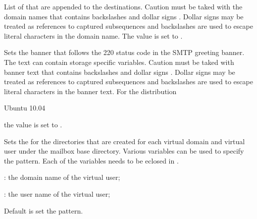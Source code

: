
List of  that are appended to the destinations.
Caution must be taked with the domain names that contains backslashes \qcode{\textbackslash} and 
dollar signs \qcode{\$}. Dollar signs may be treated as references to 
captured subsequences and backslashes are used to escape literal characters  in the domain name.
The value is set to .


Sets the banner  that follows the 220 status code in the SMTP 
greeting banner. The text can contain storage specific variables. Caution
must be taked with banner text that contains backslashes \qcode{\textbackslash} and 
dollar signs \qcode{\$}. Dollar signs may be treated as references to 
captured subsequences and backslashes are used to escape literal characters 
in the banner text.
For the distribution
\begin{inparaitem}
\item[\TheDistribution{ubuntu}] Ubuntu 10.04
\end{inparaitem}
the value is set to .


Sets the  for the directories that are created for each virtual
domain and virtual user under the mailbox base directory. 
Various variables can be used to specify the pattern.
Each of the variables needs to be eclosed in \qcode{\$\{\}}.
\begin{compactitem}
\item[\qcode{domain}:] the domain name of the virtual user;
\item[\qcode{user}:] the user name of the virtual user;
\end{compactitem}
Default is set the  pattern.


